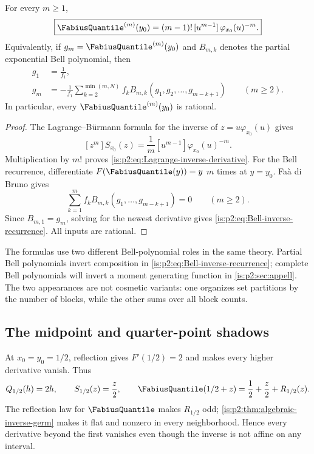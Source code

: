 \begin{theorem}
\label{is:p2:thm:inverse-derivatives}
For every $m\ge1$,
\begin{equation}
 \boxed{
 \FabiusQuantile^{(m)}(y_0)
 =(m-1)!\,[u^{m-1}]\,\varphi_{x_0}(u)^{-m}.
 }
 \label{is:p2:eq:Lagrange-inverse-derivative}
\end{equation}
Equivalently, if $g_m=\FabiusQuantile^{(m)}(y_0)$ and $B_{m,k}$ denotes the partial exponential Bell
polynomial, then
\begin{align}
 g_1&=\frac1{f_1},
 \label{is:p2:eq:g1}\\
 g_m&=-\frac1{f_1}
 \sum_{k=2}^{\min(m,N)}f_k
 B_{m,k}(g_1,g_2,\ldots,g_{m-k+1})
 \qquad(m\ge2).
 \label{is:p2:eq:Bell-inverse-recurrence}
\end{align}
In particular, every $\FabiusQuantile^{(m)}(y_0)$ is rational.
\end{theorem}

\begin{proof}
The Lagrange--B\"urmann formula for the inverse of $z=u\varphi_{x_0}(u)$ gives
\[
 [z^m]S_{x_0}(z)=\frac1m[u^{m-1}]\varphi_{x_0}(u)^{-m}.
\]
Multiplication by $m!$ proves \eqref{is:p2:eq:Lagrange-inverse-derivative}.  For the Bell recurrence,
differentiate $F(\FabiusQuantile(y))=y$ $m$ times at $y=y_0$.  Fa\`a di Bruno gives
\[
 \sum_{k=1}^{m} f_k B_{m,k}(g_1,\ldots,g_{m-k+1})=0\qquad(m\ge2).
\]
Since $B_{m,1}=g_m$, solving for the newest derivative gives
\eqref{is:p2:eq:Bell-inverse-recurrence}.  All inputs are rational.
\end{proof}

\begin{remark}
The formulas use two different Bell-polynomial roles in the same theory.  Partial Bell polynomials
invert composition in \eqref{is:p2:eq:Bell-inverse-recurrence}; complete Bell polynomials will invert a
moment generating function in \cref{is:p2:sec:appell}.  The two appearances are not cosmetic variants:
one organizes set partitions by the number of blocks, while the other sums over all block counts.
\end{remark}

\subsection{The midpoint and quarter-point shadows}

At $x_0=y_0=1/2$, reflection gives $F'(1/2)=2$ and makes every higher
derivative vanish.  Thus
\begin{equation}
 Q_{1/2}(h)=2h,
 \qquad
 S_{1/2}(z)=\frac z2,
 \qquad
 \FabiusQuantile(1/2+z)=\frac12+\frac z2+R_{1/2}(z).
 \label{is:p2:eq:midpoint-shadow}
\end{equation}
The reflection law for $\FabiusQuantile$ makes $R_{1/2}$ odd;
\cref{is:p2:thm:algebraic-inverse-germ} makes it flat and nonzero in every
neighborhood.  Hence every derivative beyond the first vanishes even though
the inverse is not affine on any interval.

